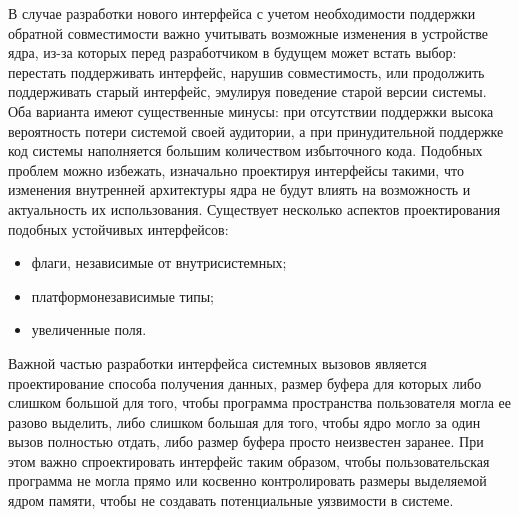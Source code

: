 В случае разработки нового интерфейса с учетом необходимости поддержки обратной
совместимости важно учитывать возможные изменения в устройстве ядра, из-за
которых перед разработчиком в будущем может встать выбор: перестать поддерживать
интерфейс, нарушив совместимость, или продолжить поддерживать старый интерфейс,
эмулируя поведение старой версии системы. Оба варианта имеют существенные
минусы: при отсутствии поддержки высока вероятность потери системой своей
аудитории, а при принудительной поддержке код системы наполняется большим
количеством избыточного кода. Подобных проблем можно избежать, изначально
проектируя интерфейсы такими, что изменения внутренней архитектуры ядра не будут
влиять на возможность и актуальность их использования. Существует несколько
аспектов проектирования подобных устойчивых интерфейсов:
\begin{itemize}
\item флаги, независимые от внутрисистемных;
\item платформонезависимые типы;
\item увеличенные поля.
\end{itemize}

Важной частью разработки интерфейса системных вызовов является проектирование
способа получения данных, размер буфера для которых либо слишком большой для
того, чтобы программа пространства пользователя могла ее разово выделить, либо
слишком большая для того, чтобы ядро могло за один вызов полностью отдать, либо
размер буфера просто неизвестен заранее. При этом важно спроектировать интерфейс
таким образом, чтобы пользовательская программа не могла прямо или косвенно
контролировать размеры выделяемой ядром памяти, чтобы не создавать потенциальные
уязвимости в системе.

